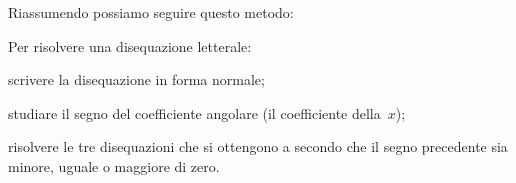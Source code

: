 Riassumendo possiamo seguire questo metodo:

\begin{procedura}{}{}
 Per risolvere una disequazione letterale:
\begin{enumeratea}
 \item scrivere la disequazione in forma normale;
 \item studiare il segno del coefficiente angolare (il coefficiente 
della~\(x\));
 \item risolvere le tre disequazioni che si ottengono a secondo che il segno 
  precedente sia minore, uguale o maggiore di zero.
\end{enumeratea}
\end{procedura}





% 
% 
% 
% 
% 
% 
%  
% 
% 

